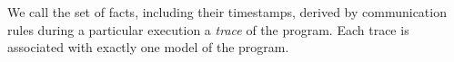 We call the set of facts, including their timestamps, derived by communication
rules during a particular execution a {\em trace} of the program.
Each trace is associated with exactly one model of the program.



% 
% 





%
%



